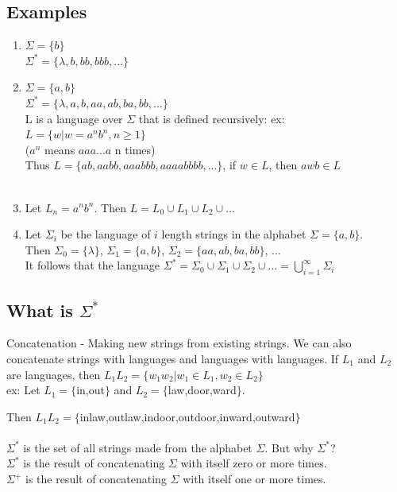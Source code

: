 \documentclass{scrartcl}
\begin{document}
\subsection{Examples}

\begin{enumerate}

\item $\Sigma = \{b\}$\\
$\Sigma^*=\{\lambda, b, bb, bbb, ...\}$

\item $\Sigma = \{a,b\}$\\
$\Sigma^*=\{\lambda, a, b, aa, ab, ba, bb, ...\}$\\
L is a language over $\Sigma$ that is defined recursively:
ex: $L=\{w|w=a^nb^n, n\ge1\}$\\
($a^n$ means $aaa...a$ n times)\\
Thus $L=\{ab, aabb, aaabbb, aaaabbbb, ...\}$, if $w \in L$, then $awb \in L$\\\\

\item Let $L_n={a^nb^n}$. Then $L = L_0 \cup L_1 \cup L_2 \cup ... $

\item Let $\Sigma_i$ be the language of $i$ length strings in the alphabet $\Sigma=\{a,b\}$.\\
Then $\Sigma_0=\{\lambda\}$, $\Sigma_1=\{a,b\}$, $\Sigma_2=\{aa, ab, ba, bb\}$, ...\\
It follows that the language $\Sigma^*=\Sigma_0 \cup \Sigma_1 \cup \Sigma_2 \cup ...=\bigcup_{i=1}^{\infty} \Sigma_i$

\end{enumerate}

\subsection{What is $\Sigma^*$}

Concatenation - Making new strings from existing strings. We can also concatenate strings with languages and languages with languages.
If $L_1$ and $L_2$ are languages, then $L_1L_2=\{w_1w_2|w_1 \in L_1, w_2 \in L_2\}$\\

ex: Let $L_1=\{$in,out$\}$ and $L_2=\{$law,door,ward$\}$.

Then $L_1L_2=\{$inlaw,outlaw,indoor,outdoor,inward,outward$\}$\\\\
$\Sigma^*$ is the set of all strings made from the alphabet $\Sigma$. But why $\Sigma^*$?\\
$\Sigma^*$ is the result of concatenating $\Sigma$ with itself zero or more times.\\
$\Sigma^+$ is the result of concatenating $\Sigma$ with itself one or more times.
\end{document}
